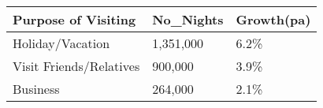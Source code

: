 \begin{tabular}[t]{p{4.7cm}p{1.25cm}p{1.3cm}}
  \hline
Purpose of Visiting & No\_Nights & Growth(pa) \\ 
  \hline
Holiday/Vacation & 1,351,000 & 6.2\% \\ 
  Visit Friends/Relatives &   900,000 & 3.9\% \\ 
  Business &   264,000 & 2.1\% \\ 
   \hline
\end{tabular}
